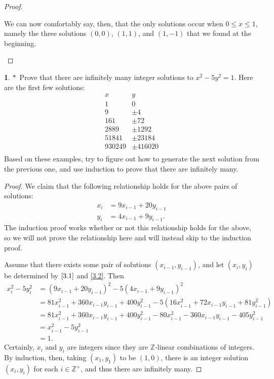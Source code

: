 \documentclass[12pt]{article}
\theoremstyle{definition}
\newtheorem{ex}{}
\begin{document}
\begin{proof}
\begin{enumerate}[label=(\alph*)]
          We can now comfortably say, then, that the only solutions occur when $0 \leq x \leq 1$, namely the three solutions $(0, 0)$, $(1, 1)$, and $(1, -1)$ that we found at the beginning.
	\end{enumerate}

\end{proof}

\begin{ex}
	$\ast$\ Prove that there are infinitely many integer solutions to $x^2 - 5y^2 = 1$.
	Here are the first few solutions:
	\begin{equation*}
		\begin{array}{cc}
			x      & y          \\
			\hline
			1      & 0          \\
			9      & \pm 4      \\
			161    & \pm 72     \\
			2889   & \pm 1292   \\
			51841  & \pm 23184  \\
			930249 & \pm 416020 \\
		\end{array}
	\end{equation*}
	Based on these examples, try to figure out how to generate the next solution from the previous one, and use induction to prove that there are infinitely many.
\end{ex}
\begin{proof}
	We claim that the following relationship holds for the above pairs of solutions: \begin{align}
		x_i & = 9x_{i-1} + 20y_{i - 1}\label{3.1} \\
		y_i & = 4x_{i-1} + 9y_{i - 1}.\label{3.2}
	\end{align}
	The induction proof works whether or not this relationship holds for the above, so we will not prove the relationship here and will instead skip to the induction proof.

	Assume that there exists some pair of solutions $(x_{i-1}, y_{i-1})$, and let $(x_i, y_i)$ be determined by $\eqref{3.1}$ and \eqref{3.2}.
	Then \begin{align*}
		x_i^2 - 5y_i^2 & = (9x_{i - 1} + 20y_{i - 1})^2 - 5(4x_{i-1} + 9y_{i-1})^2                                          \\
		               & = 81x_{i-1}^2 + 360x_{i-1}y_{i-1} + 400y_{i-1}^2 - 5(16x_{i-1}^2 + 72x_{i-1}y_{i-1} + 81y_{i-1}^2) \\
		               & = 81x_{i-1}^2 + 360x_{i-1}y_{i-1} + 400y_{i-1}^2 - 80x_{i-1}^2 - 360x_{i-1}y_{i-1} - 405y_{i-1}^2  \\
		               & = x_{i-1}^2 - 5y_{i-1}^2                                                                           \\
		               & = 1.
	\end{align*}
	Certainly, $x_i$ and $y_i$ are integers since they are $\mathbb{Z}$-linear combinations of integers.
	By induction, then, taking $(x_1, y_1)$ to be $(1, 0)$, there is an integer solution $(x_i, y_i)$ for each $i \in \mathbb{Z}^+$, and thus there are infinitely many.
\end{proof}
\end{document}
